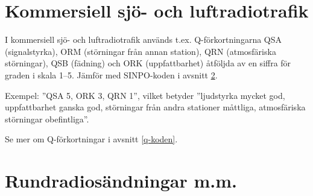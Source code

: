 \section{Kommersiell sjö- och luftradiotrafik}

I kommersiell sjö- och luftradiotrafik används t.ex. Q-förkortningarna
QSA (signalstyrka), ORM (störningar från annan station), QRN
(atmosfäriska störningar), QSB (fädning) och ORK (uppfattbarhet)
åtföljda av en siffra för graden i skala 1--5. Jämför med SINPO-koden
i avsnitt \ref{sinpo}.

Exempel:
''QSA 5, ORK 3, QRN 1'', vilket betyder
''ljudstyrka mycket god, uppfattbarhet ganska god, störningar från andra stationer
måttliga, atmosfäriska störningar obefintliga''.

Se mer om Q-förkortningar i avsnitt \ref{q-koden}.

\section{Rundradiosändningar m.m.}
\label{sinpo}

